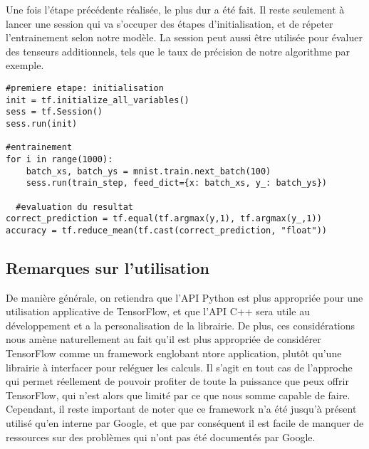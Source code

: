 Une fois l'étape précédente réalisée, le plus dur a été fait. Il reste seulement à lancer une session qui va s'occuper des étapes d'initialisation, et de répeter l'entrainement selon notre modèle.
La session peut aussi être utilisée pour évaluer des tenseurs additionnels, tels que le taux de précision de notre algorithme par exemple.

\newpage
        \lstset{style=Python}
        \begin{lstlisting}[caption=Exemple de définition d'un modèle linéaire pour le cas du MINST]
#premiere etape: initialisation
init = tf.initialize_all_variables()
sess = tf.Session()
sess.run(init)

#entrainement
for i in range(1000):
    batch_xs, batch_ys = mnist.train.next_batch(100)
    sess.run(train_step, feed_dict={x: batch_xs, y_: batch_ys})
        
  #evaluation du resultat  
correct_prediction = tf.equal(tf.argmax(y,1), tf.argmax(y_,1))
accuracy = tf.reduce_mean(tf.cast(correct_prediction, "float"))
        \end{lstlisting}


\subsection{Remarques sur l'utilisation}
De manière générale, on retiendra que l'API Python est plus appropriée pour une utilisation applicative de TensorFlow, et que l'API C++ sera utile au développement et a la personalisation de la librairie.
De plus, ces considérations nous amène naturellement au fait qu'il est plus appropriée de considérer TensorFlow comme un framework englobant ntore application, plutôt qu’une librairie à interfacer pour reléguer les calculs.
Il s'agit en tout cas de l'approche qui permet réellement de pouvoir profiter de toute la puissance que peux offrir TensorFlow, qui n'est alors que limité par ce que nous somme capable de faire.
Cependant, il reste important de noter que ce framework n'a été jusqu'à présent utilisé qu'en interne par Google, et que par conséquent il est facile de manquer de ressources sur des problèmes qui n'ont pas été documentés par Google.
